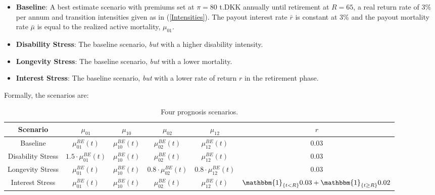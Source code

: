 \documentclass{article}
\newcommand{\1}[1]{\mathbbm{1}_{\left\lbrace #1 \right\rbrace}}
\theoremstyle{break}
\theoremstyle{remark}
\numberwithin{equation}{section}
\begin{document}
\begin{itemize}
	\item \textbf{Baseline}: A best estimate scenario with premiums set at $\pi = 80$ t.DKK annually until retirement at $R=65$, a real return rate of 3\% per annum and transition intensities given as in (\ref{Intensities}). The payout interest rate $\bar{r}$ is constant at 3\% and the payout mortality rate $\bar{\mu}$ is equal to the realized active mortality, $\mu_{01}$.
	\item \textbf{Disability Stress}: The baseline scenario, \textit{but} with a higher disability intensity.
	\item \textbf{Longevity Stress}: The baseline scenario, \textit{but} with a lower mortality.
	\item \textbf{Interest Stress}: The baseline scenario, \textit{but} with a lower rate of return $r$ in the retirement phase.
\end{itemize}

Formally, the scenarios are:

\begin{table}[H]
	\caption{Four prognosis scenarios.}
	\begin{center}
	\begin{tabular}{ |c|c|c|c|c|c| }
		\hline
		Scenario & $\mu_{01}$ & $\mu_{10}$ & $\mu_{02}$ & $\mu_{12}$ & $r$ \\
		\hline
		Baseline & $\mu_{01}^{BE}(t)$ & $\mu_{10}^{BE}(t)$ & $\mu_{02}^{BE}(t)$ &$\mu_{12}^{BE}(t)$ & 0.03 \\
		Disability Stress & $1.5 \cdot \mu_{01}^{BE}(t)$ & $\mu_{10}^{BE}(t)$ & $\mu_{02}^{BE}(t)$ & $\mu_{12}^{BE}(t)$ & 0.03 \\
		Longevity Stress & $\mu_{01}^{BE}(t)$ & $\mu_{10}^{BE}(t)$ & $0.8 \cdot \mu_{02}^{BE}(t)$ & $0.8 \cdot \mu_{12}^{BE}(t)$ & 0.03 \\
		Interest Stress & $\mu_{01}^{BE}(t)$ & $\mu_{10}^{BE}(t)$ & $\mu_{02}^{BE}(t)$ & $\mu_{12}^{BE}(t)$ & $\1{t < R} 0.03 + \1{t \geq R} 0.02$ \\
		\hline
	\end{tabular}
\newline
\end{center}
\end{table}
\end{document}
